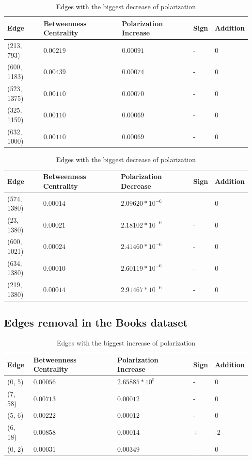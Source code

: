 \begin{table}[H]
 \centering
 \caption{Edges with the biggest increase of polarization}
 \label{tab:edgesLargest}
 \begin{tabular}{| l || l | l | l | l |}
 \hline
  Edge & Betweenness Centrality & Polarization Increase & Sign & Addition\\
  \hline
  \hline
  (213, 793) & $0.00219$ & $0.00091$ & - &  0\\
  \hline
  (600, 1183) & $0.00439$ & $0.00074$ & - &  0\\
  \hline
  (523, 1375) & $0.00110$ & $0.00070$ & - &  0\\
  \hline
  (325, 1159) & $0.00110$ & $0.00069$ & - &  0\\
  \hline
  (632, 1000) & $0.00110$ & $0.00069$ & - &  0\\
  \hline
 \end{tabular}
 
 
 \caption{Edges with the biggest decrease of polarization }
 \label{tab:edgesLargest}
 \begin{tabular}{| l || l | l | l | l |}
 \hline
  Edge & Betweenness Centrality & Polarization Decrease & Sign & Addition\\
  \hline
  \hline
  (574, 1380) & $0.00014$ & $2.09620*10^{-6}$ & - &  0\\
  \hline
  (23, 1380) & $0.00021$ & $2.18102*10^{-6}$ & - &  0\\
  \hline
  (600, 1021) & $0.00024$ & $2.41460*10^{-6}$ & - &  0\\
  \hline
  (634, 1380) & $0.00010$ & $2.60119*10^{-6}$ & - &  0\\
  \hline
  (219, 1380) & $0.00014$ & $2.91467*10^{-6}$ & - &  0\\
  \hline
  \hline
 \end{tabular}
 
\end{table}

\subsection{Edges removal in the Books dataset}
\begin{table}[H]
 \centering
 \caption{Edges with the biggest increase of polarization }
 \label{tab:edgesLargest}
 \begin{tabular}{| l || l | l | l | l |}
 \hline
  Edge & Betweenness Centrality & Polarization Increase & Sign & Addition\\
  \hline
  \hline
  (0, 5) & $0.00056$ & $2.65885*10^5$ & - &  0\\
  \hline
  (7, 58) & $0.00713$ & $0.00012$ & - &  0\\
  \hline
  (5, 6) & $0.00222$ & $0.00012$ & - &  0\\
  \hline
  (6, 18) & $0.00858$ & $0.00014$ & +& -2\\
  \hline
  (0, 2) & $0.00031$ & $0.00349$ & - &  0\\
  \hline
 \end{tabular}
\end{table}


